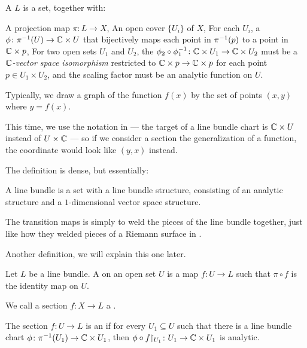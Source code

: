 \begin{definition}
	A  $L$ is a set, together with:
	\begin{itemize}
		\ii A projection map $\pi \colon L \to X$,
		\ii An open cover $\{ U_i \}$ of $X$,
		\ii For each $U_i$, a  $\phi \colon \pi^{-1}(U) \to \mathbb C \times U$
		that bijectively maps each point in $\pi^{-1}(p)$ to a point in $\mathbb C \times p$,
		\ii For two open sets $U_1$ and $U_2$, the  $\phi_2 \circ
		\phi_1^{-1} \colon \mathbb C \times U_1 \to \mathbb C \times U_2$ must be a \emph{$\mathbb C$-vector space
		isomorphism} restricted to $\mathbb C \times p \to \mathbb C \times p$ for each point $p \in U_1 \times
		U_2$, and the scaling factor must be an analytic function on $U$.
	\end{itemize}
\end{definition}

\begin{remark}[Warning]
	Typically, we draw a graph of the function $f(x)$ by the set of points $(x, y)$ where $y =
	f(x)$.

	This time, we use the notation in \cite{ref:miranda} --- the target of a line bundle chart is
	$\mathbb C \times U$ instead of $U \times \mathbb C$ ---
	so if we consider a section the generalization of a function, the
	coordinate would look like $(y, x)$ instead.
\end{remark}

The definition is dense, but essentially:
\begin{moral}
	A line bundle is a set with a line bundle structure, consisting of an analytic structure and a
	$1$-dimensional vector space structure.
\end{moral}
The transition maps is simply to weld the pieces of the line bundle together, just like how they
welded pieces of a Riemann surface in .

Another definition, we will explain this one later.
\begin{definition}
	Let $L$ be a line bundle. A  on an open set $U$
	is a map $f \colon U \to L$ such that $\pi \circ f$ is
	the identity map on $U$.

	We call a section $f \colon X \to L$ a .

	The section $f \colon U \to L$ is an  if for every $U_1 \subseteq U$
	such that there is a line bundle chart $\phi \colon \pi^{-1}(U_1) \to \mathbb C \times U_1$, then
	$\phi \circ f\restrict{U_1} \colon U_1 \to \CC \times U_1$ is analytic.
\end{definition}

